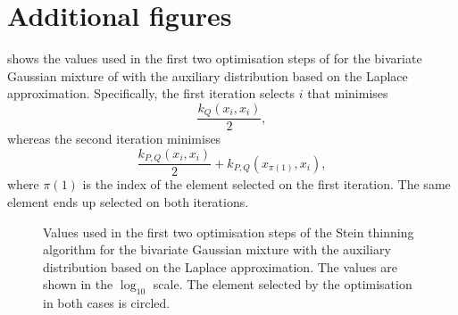 \documentclass[11pt,a4paper]{report}
\begin{document}
\chapter{Additional figures}
\label{appendix:figures}

 shows the values used in the first two optimisation steps of  for the bivariate Gaussian mixture of  with the auxiliary distribution based on the Laplace approximation. Specifically, the first iteration selects $i$ that minimises
\begin{equation*}
\frac{k_Q(x_i, x_i)}{2},
\end{equation*}
whereas the second iteration minimises
\begin{equation*}
\frac{k_{P,Q}(x_i, x_i)}{2} + k_{P,Q}(x_{\pi(1)}, x_i),
\end{equation*}
where $\pi(1)$ is the index of the element selected on the first iteration. The same element ends up selected on both iterations.

\begin{figure}[h]
\centering
{}
\caption{Values used in the first two optimisation steps of the Stein thinning algorithm for the bivariate Gaussian mixture with the auxiliary distribution based on the Laplace approximation. The values are shown in the $\log_{10}$ scale. The element selected by the optimisation in both cases is circled.
\label{fig:gmm:laplace:first-iterations}}
\end{figure}
\end{document}
